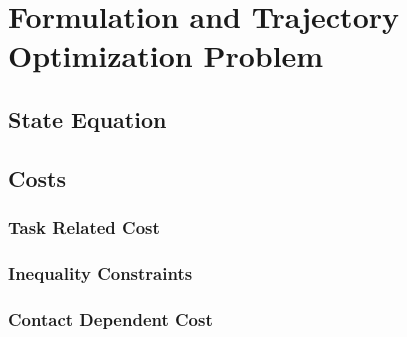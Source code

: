 \documentclass[main.tex]{subfiles}
\begin{document}
\section{Formulation and Trajectory Optimization Problem}\label{sec:formulation}

\subsection{State Equation}
\subsection{Costs}
\subsubsection{Task Related Cost}
\subsubsection{Inequality Constraints}
\subsubsection{Contact Dependent Cost}
\end{document}
